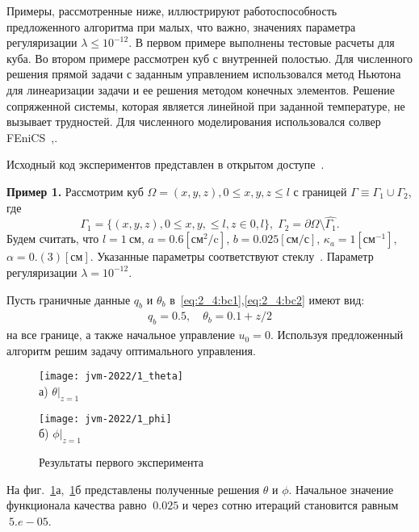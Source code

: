 Примеры, рассмотренные ниже, иллюстрируют работоспособность предложенного алгоритма при
малых, что важно, значениях параметра регуляризации $\lambda \leq 10^{-12}$.
В первом примере выполнены тестовые расчеты для куба.
Во втором примере рассмотрен куб с внутренней полостью.
Для численного решения прямой задачи с заданным управлением использовался
метод Ньютона для линеаризации задачи и ее решения методом конечных элементов.
Решение сопряженной системы, которая является линейной
при заданной температуре, не вызывает трудностей.
Для численного моделирования использовался солвер FEniCS~\cite{fenics},\cite{dolfin}.

Исходный код экспериментов представлен в открытом доступе~\cite{mesenev-github}.

\textbf{Пример 1.}
Рассмотрим куб $\Omega = {(x, y, z), 0 \leq x,y,z \leq l}$ с границей
$\Gamma \equiv \Gamma_1 \cup \Gamma_2$, где
\[
    \Gamma_1 = \{(x, y, z), 0 \leq x,y, \leq l, z \in 0, l\}, \;
    \Gamma_2 = \partial \Omega \setminus \hat{\Gamma_1}.
\]
Будем считать, что
$l = 1~\text{см}$,
$a = 0.6[\text{см}^2/\text{c}]$,
$b = 0.025[\text{см}/\text{с}]$,
$\kappa_a = 1[\text{см}^{-1}]$,
$\alpha = 0.(3)[\text{см}]$.
Указанные параметры соответствуют стеклу~\cite{Grenkin2016a}.
Параметр регуляризации $\lambda=10^{-12}$.

Пусть граничные данные $q_b$ и $\theta_b$ в~\eqref{eq:2_4:bc1},\eqref{eq:2_4:bc2} имеют вид:
\begin{gather*}
    q_b = 0.5, \quad
    \theta_b = 0.1 + z/2
\end{gather*}
на все границе, а также начальное управление $u_0 = 0$.
Используя предложенный алгоритм решим задачу оптимального управления.

\begin{figure}[ht]
    \begin{minipage}[b][][b]{0.49\linewidth}
        \centering
        \texttt{[image: jvm-2022/1\_theta]}
        \\ а) $\theta|_{z=1}$
    \end{minipage}
    \hfill
    \begin{minipage}[b][][b]{0.49\linewidth}
        \centering
        \texttt{[image: jvm-2022/1\_phi]}
        \\ б) $\phi|_{z=1}$
    \end{minipage}
    \caption{Результаты первого эксперимента}
    \label{fig:4_4:5}
\end{figure}

На фиг.~\ref{fig:4_4:5}а,~\ref{fig:4_4:5}б представлены
полученные решения $\theta$ и $\phi$.
Начальное значение функционала качества равно $~0.025$ и
через сотню итераций становится равным $~5.e-05$.

